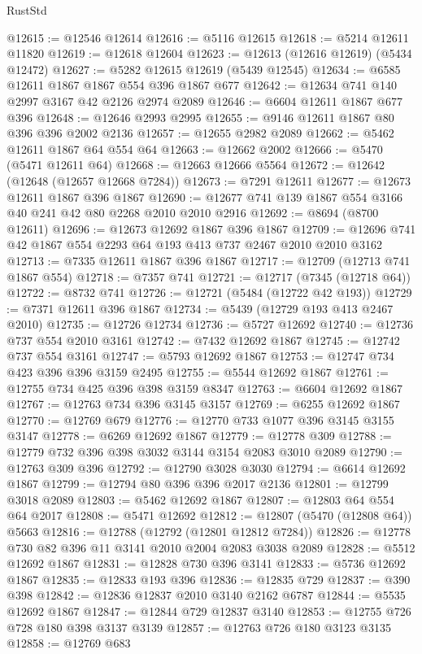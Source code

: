 \begin{lexlean}{RustStd}
\begin{coremodule}
{\begin{coremodule}
{{{{{{{{{{{{{{{{{{{{{{{{{{{{{{{@12615 := @12546 @12614
@12616 := @5116 @12615
@12618 := @5214 @12611 @11820
@12619 := @12618 @12604
@12623 := @12613 (@12616 @12619) (@5434 @12472)
@12627 := @5282 @12615 @12619 (@5439 @12545)
@12634 := @6585 @12611 @1867 @1867 @554 @396 @1867 @677
@12642 := @12634 @741 @140 @2997 @3167 @42 @2126 @2974 @2089
@12646 := @6604 @12611 @1867 @677 @396
@12648 := @12646 @2993 @2995
@12655 := @9146 @12611 @1867 @80 @396 @396 @2002 @2136
@12657 := @12655 @2982 @2089
@12662 := @5462 @12611 @1867 @64 @554 @64
@12663 := @12662 @2002
@12666 := @5470 (@5471 @12611 @64)
@12668 := @12663 @12666 @5564
@12672 := @12642 (@12648 (@12657 @12668 @7284))
@12673 := @7291 @12611
@12677 := @12673 @12611 @1867 @396 @1867
@12690 := @12677 @741 @139 @1867 @554 @3166 @40 @241 @42 @80 @2268 @2010 @2010 @2916
@12692 := @8694 (@8700 @12611)
@12696 := @12673 @12692 @1867 @396 @1867
@12709 := @12696 @741 @42 @1867 @554 @2293 @64 @193 @413 @737 @2467 @2010 @2010 @3162
@12713 := @7335 @12611 @1867 @396 @1867
@12717 := @12709 (@12713 @741 @1867 @554)
@12718 := @7357 @741
@12721 := @12717 (@7345 (@12718 @64))
@12722 := @8732 @741
@12726 := @12721 (@5484 (@12722 @42 @193))
@12729 := @7371 @12611 @396 @1867
@12734 := @5439 (@12729 @193 @413 @2467 @2010)
@12735 := @12726 @12734
@12736 := @5727 @12692
@12740 := @12736 @737 @554 @2010 @3161
@12742 := @7432 @12692 @1867
@12745 := @12742 @737 @554 @3161
@12747 := @5793 @12692 @1867
@12753 := @12747 @734 @423 @396 @396 @3159 @2495
@12755 := @5544 @12692 @1867
@12761 := @12755 @734 @425 @396 @398 @3159 @8347
@12763 := @6604 @12692 @1867
@12767 := @12763 @734 @396 @3145 @3157
@12769 := @6255 @12692 @1867
@12770 := @12769 @679
@12776 := @12770 @733 @1077 @396 @3145 @3155 @3147
@12778 := @6269 @12692 @1867
@12779 := @12778 @309
@12788 := @12779 @732 @396 @398 @3032 @3144 @3154 @2083 @3010 @2089
@12790 := @12763 @309 @396
@12792 := @12790 @3028 @3030
@12794 := @6614 @12692 @1867
@12799 := @12794 @80 @396 @396 @2017 @2136
@12801 := @12799 @3018 @2089
@12803 := @5462 @12692 @1867
@12807 := @12803 @64 @554 @64 @2017
@12808 := @5471 @12692
@12812 := @12807 (@5470 (@12808 @64)) @5663
@12816 := @12788 (@12792 (@12801 @12812 @7284))
@12826 := @12778 @730 @82 @396 @11 @3141 @2010 @2004 @2083 @3038 @2089
@12828 := @5512 @12692 @1867
@12831 := @12828 @730 @396 @3141
@12833 := @5736 @12692 @1867
@12835 := @12833 @193 @396
@12836 := @12835 @729
@12837 := @390 @398
@12842 := @12836 @12837 @2010 @3140 @2162 @6787
@12844 := @5535 @12692 @1867
@12847 := @12844 @729 @12837 @3140
@12853 := @12755 @726 @728 @180 @398 @3137 @3139
@12857 := @12763 @726 @180 @3123 @3135
@12858 := @12769 @683
}}}}}}}}}}}}}}}}}}}}}}}}}}}}}}}
\end{coremodule}}
\end{coremodule}
\end{lexlean}

